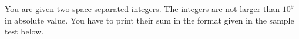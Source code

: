 
You are given two space-separated integers.
The integers are not larger than $10^9$ in absolute value.
You have to print their sum in the format given in the sample test below.

